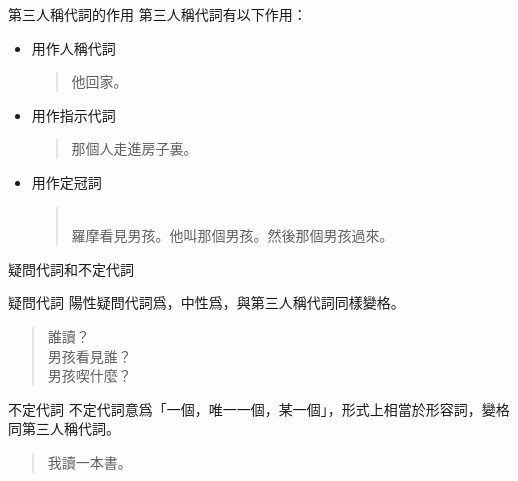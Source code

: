 \documentclass[aspectratio=169]{beamer}
\begin{document}
\begin{frame}{第三人稱代詞的作用}
    第三人稱代詞有以下作用：

        \begin{itemize}
            \item 用作人稱代詞\\
            \begin{quotation}
                \rmfamily
                 他回家。
            \end{quotation}
            \item 用作指示代詞\\
            \begin{quotation}
                \rmfamily
                 那個人走進房子裏。
            \end{quotation}
            \item 用作定冠詞\\
            \begin{quotation}
                \rmfamily
                \\
                羅摩看見男孩。他叫那個男孩。然後那個男孩過來。
            \end{quotation}
        \end{itemize}
\end{frame}

\begin{frame}{疑問代詞和不定代詞}
    \begin{block}{疑問代詞}
        陽性疑問代詞爲，中性爲，與第三人稱代詞同樣變格。
        
        \begin{quotation}\rmfamily
             誰讀？\\
             男孩看見誰？\\
             男孩喫什麼？
        \end{quotation}
    \end{block}

    \begin{block}{不定代詞}
        不定代詞意爲「一個，唯一一個，某一個」，形式上相當於形容詞，變格同第三人稱代詞。

        \begin{quotation}
            \rmfamily
             我讀一本書。
        \end{quotation}
    \end{block}
\end{frame}
\end{document}
